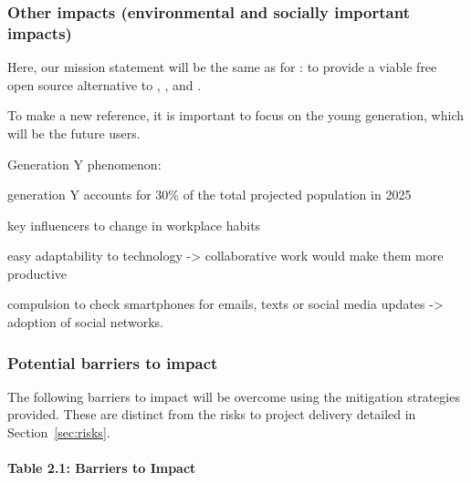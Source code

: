 \subsubsection{Other impacts (environmental and socially important impacts)}


Here, our mission statement will be the same as for \Sage: to provide
a viable free open source alternative to \Magma, \Maple, \Mathematica
and \Matlab.

To make \TheProject a new reference, it is important to focus on the young
generation, which will be the future users.

Generation Y phenomenon:

\begin{compactenum}
\item generation Y accounts for 30\% of the total projected population
in 2025
\item key influencers to change in workplace habits
\item easy adaptability to technology -{\textgreater} collaborative work
would make them more productive
\item compulsion to check smartphones for emails, texts or social media
updates -{\textgreater} adoption of social networks.
\end{compactenum}

\subsubsection{Potential barriers to impact}

The following barriers to impact will be overcome using the mitigation
strategies provided. These are distinct from the risks to project delivery
detailed in Section~\ref{sec:risks}.
\paragraph{Table 2.1: Barriers to Impact}

\ \\

